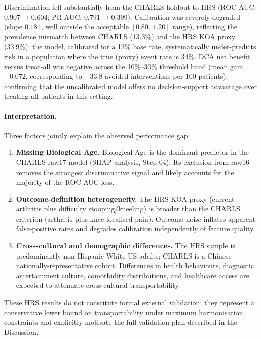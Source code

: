 \documentclass[11pt,a4paper]{article}
\begin{document}
Discrimination fell substantially from the CHARLS holdout to HRS
(ROC-AUC: $0.907 \rightarrow 0.604$; PR-AUC: $0.791 \rightarrow 0.399$). Calibration was severely
degraded (slope $0.184$, well outside the acceptable $[0.80,\,1.20]$ range), reflecting the
prevalence mismatch between CHARLS (13.3\%) and the HRS KOA proxy (33.9\%): the model, calibrated
for a 13\% base rate, systematically under-predicts risk in a population where the true (proxy) event
rate is 34\%. DCA net benefit versus treat-all was negative across the 10\%--30\% threshold band
(mean gain $-0.072$, corresponding to $-33.8$ avoided interventions per 100 patients), confirming
that the uncalibrated model offers no decision-support advantage over treating all patients in this
setting.

\paragraph{Interpretation.} Three factors jointly explain the observed performance gap:

\begin{enumerate}
  \item \textbf{Missing Biological Age.} Biological Age is the dominant predictor in the CHARLS
        raw17 model (SHAP analysis, Step 04). Its exclusion from raw16 removes the strongest
        discriminative signal and likely accounts for the majority of the ROC-AUC loss.
  \item \textbf{Outcome-definition heterogeneity.} The HRS KOA proxy (current arthritis plus
        difficulty stooping/kneeling) is broader than the CHARLS criterion (arthritis plus
        knee-localised pain). Outcome noise inflates apparent false-positive rates and degrades
        calibration independently of feature quality.
  \item \textbf{Cross-cultural and demographic differences.} The HRS sample is predominantly
        non-Hispanic White US adults; CHARLS is a Chinese nationally-representative cohort.
        Differences in health behaviours, diagnostic ascertainment culture, comorbidity
        distributions, and healthcare access are expected to attenuate cross-cultural
        transportability.
\end{enumerate}

These HRS results do not constitute formal external validation; they represent a conservative lower
bound on transportability under maximum harmonisation constraints and explicitly motivate the full
validation plan described in the Discussion.
\end{document}
